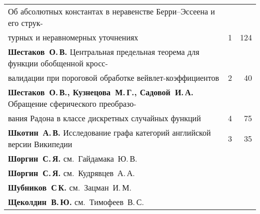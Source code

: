 {\begin{tabular}{p{388pt}rr}
Об абсолютных константах в неравенстве Берри--Эссеена и его струк-\linebreak
\vspace*{-12pt}\\
\hspace*{23pt}турных и неравномерных уточнениях\dotfill&1&124\\
\textbf{Шестаков~О.\,В.}
Центральная предельная теорема для функции обобщенной кросс-\linebreak
\vspace*{-12pt}\\
\hspace*{23pt}валидации при пороговой обработке вейвлет-коэффициентов\dotfill&2&40\\
\textbf{Шестаков~О.\,В., Кузнецова~М.\,Г., Садовой~И.\,А.}
Обращение сферического преобразо-\linebreak
\vspace*{-12pt}\\
\hspace*{23pt}вания Радона в классе дискретных случайных функций\dotfill&4&75\\
\textbf{Шкотин~А.\,В.}
Исследование графа категорий английской версии Википедии\dotfill&3&35\\
\textbf{Шоргин~С.\,Я.} см.~Гайдамака~Ю.\,В.&&\\
\textbf{Шоргин~С.\,Я.} см.~Кудрявцев~А.\,А.&&\\
\textbf{Шубников~С\,К.} см.~Зацман~И.\,М.&&\\
\textbf{Щеколдин~В.\,Ю.} см.~Тимофеев~В.\,С.&&\\
\end{tabular}
}

\def\leftfootline{\small{\textbf{\thepage}
\hfill ИНФОРМАТИКА И ЕЁ ПРИМЕНЕНИЯ\ \ \ том~7\ \ \ выпуск~4\ \ \ 2013}
}%
 \def\rightfootline{\small{ИНФОРМАТИКА И ЕЁ ПРИМЕНЕНИЯ\ \ \ том~7\ \ \ выпуск~4\ \ \ 2013
 \hfill \textbf{\thepage}}}
 \label{end\stat}